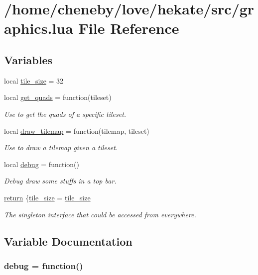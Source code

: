 \hypertarget{graphics_8lua}{\section{/home/cheneby/love/hekate/src/graphics.lua File Reference}
\label{graphics_8lua}
}
\subsection*{Variables}
\begin{DoxyCompactItemize}
\item 
local \hyperlink{graphics_8lua_aae867dcd40ede70426d25eca1e80882f}{tile\-\_\-size} = 32
\item 
local \hyperlink{graphics_8lua_a2defc00ef60eed47fe18feeb56f113ec}{get\-\_\-quads} = function(tileset)
\begin{DoxyCompactList}\small\item\em Use to get the quads of a specific tileset. \end{DoxyCompactList}\item 
local \hyperlink{graphics_8lua_a20c63f09b77cbb8f5cff2982ce200ef4}{draw\-\_\-tilemap} = function(tilemap, tileset)
\begin{DoxyCompactList}\small\item\em Use to draw a tilemap given a tileset. \end{DoxyCompactList}\item 
local \hyperlink{graphics_8lua_a0514aabed091ee5e2f35766eb01eced6}{debug} = function()
\begin{DoxyCompactList}\small\item\em Debug draw some stuffs in a top bar. \end{DoxyCompactList}\item 
\hyperlink{graphics_8lua_a9717e7bbecb906637e86cef6da3d83c2}{return} \{\hyperlink{graphics_8lua_aae867dcd40ede70426d25eca1e80882f}{tile\-\_\-size} = \hyperlink{graphics_8lua_aae867dcd40ede70426d25eca1e80882f}{tile\-\_\-size}
\begin{DoxyCompactList}\small\item\em The singleton interface that could be accessed from everywhere. \end{DoxyCompactList}\end{DoxyCompactItemize}


\subsection{Variable Documentation}
\hypertarget{graphics_8lua_a0514aabed091ee5e2f35766eb01eced6}{
\subsubsection[{debug}]{\setlength{\rightskip}{0pt plus 5cm}debug = function()}}\label{graphics_8lua_a0514aabed091ee5e2f35766eb01eced6}


